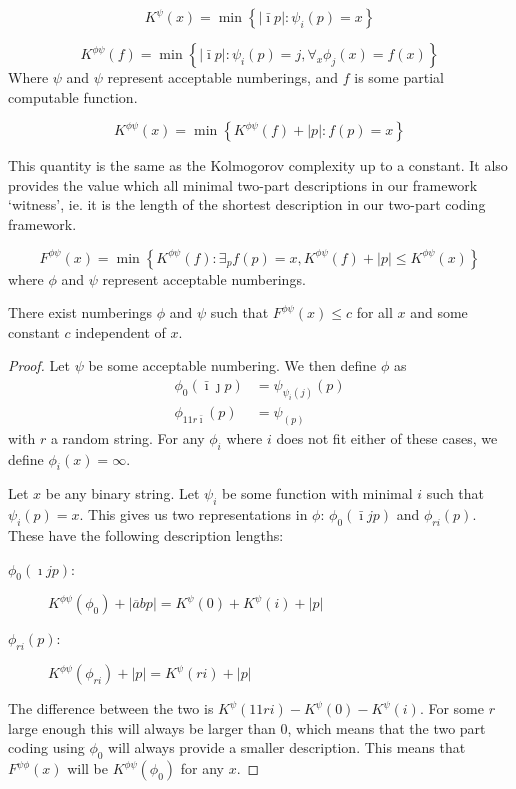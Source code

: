 \documentclass{style/llncs}
\begin{document}
\begin{definition}
\[
K^\psi(x) = \min\left\{|\bar\imath p| : \psi_i(p) = x\right\}
\]
\end{definition}

\begin{definition}
\[
K^{\phi\psi}(f) = \min\left\{|\bar\imath p| : \psi_i(p) = j, \forall_x\phi_j(x) = f(x)\right\}
\]
Where $\psi$ and $\psi$ represent acceptable numberings, and $f$ is some partial computable function.
\end{definition}

\begin{definition}
\[
K^{\phi\psi}(x) = \min\left\{K^{\phi\psi}(f) + |p|: f(p) = x\right\}
\]
\end{definition}
This quantity is the same as the Kolmogorov complexity up to a constant. It also provides the value which all minimal two-part descriptions in our framework `witness', ie. it is the length of the shortest description in our two-part coding framework.

\begin{definition}[Sophistication]
\[
F^{\phi\psi}(x) = \min\left\{K^{\phi\psi}(f) : \exists_p f(p) = x, K^{\phi\psi}(f)+|p| \leq K^{\phi\psi}(x)\right\}
\]
where $\phi$ and $\psi$ represent acceptable numberings.
\end{definition}

\begin{lemma}
There exist numberings $\phi$ and $\psi$ such that $F^{\phi\psi}(x) \leq c$ for all $x$ and some constant $c$ independent of $x$. \label{lemma:constant}
\end{lemma}
\begin{proof}
Let $\psi$ be some acceptable numbering. We then define $\phi$ as
\begin{align*}
\phi_0(\bar\imath\jmath p) &= \psi_{\psi_i(j)}(p) \\
\phi_{11r\bar\imath}(p) &= \psi_(p)
\end{align*}
with $r$ a random string. For any $\phi_i$ where $i$ does not fit either of these cases, we define $\phi_i(x) = \infty$. 

Let $x$ be any binary string. Let $\psi_i$ be some function with minimal $i$ such that $\psi_i(p) = x$. This gives us two representations in $\phi$: $\phi_0(\bar\imath j p)$ and $\phi_{ri}(p)$. These have the following description lengths:

\begin{description}
\item[$\phi_0(\imath j p)$:] $K^{\phi\psi}(\phi_0) + |\overline{a}bp| = K^\psi(0) + K^\psi(i) + |p|$
\item[$\phi_{ri}(p)$:] $K^{\phi\psi}(\phi_{ri}) + |p| = K^{\psi}(ri) + |p|$
\end{description}

The difference between the two is $K^{\psi}(11ri) - K^\psi(0) - K^\psi(i)$. For some $r$ large enough this will always be larger than $0$, which means that the two part coding using $\phi_0$ will always provide a smaller description. 
This means that $F^{\psi\phi}(x)$ will be $K^{\phi\psi}(\phi_0)$ for any $x$.
\end{proof}
\end{document}
